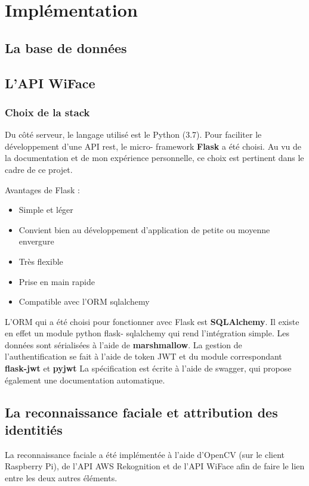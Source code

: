 \chapter{Implémentation}
\label{ch:implémentation}

\section{La base de données}

\section{L'API WiFace}

\subsection{Choix de la stack}

Du côté serveur, le langage utilisé est le Python (3.7). Pour faciliter le développement d’une API rest, le micro-
framework \textbf{Flask} a été choisi. Au vu de la documentation et de mon expérience personnelle, ce choix est pertinent
dans le cadre de ce projet.

Avantages de Flask :
\begin{itemize}
\item Simple et léger
\item Convient bien au développement d’application de petite ou moyenne envergure
\item Très flexible
\item Prise en main rapide
\item Compatible avec l’ORM sqlalchemy
\end{itemize}

L’ORM qui a été choisi pour fonctionner avec Flask est \textbf{SQLAlchemy}. Il existe en effet un module python flask-
sqlalchemy qui rend l’intégration simple.
Les données sont sérialisées à l’aide de \textbf{marshmallow}.
La gestion de l’authentification se fait à l’aide de token JWT et du module correspondant \textbf{flask-jwt} et \textbf{pyjwt}
La spécification est écrite à l’aide de swagger, qui propose également une documentation automatique.

\section{La reconnaissance faciale et attribution des identitiés}

La reconnaissance faciale a été implémentée à l'aide d'OpenCV (sur le client Raspberry Pi), de l'API AWS Rekognition et de l'API WiFace
afin de faire le lien entre les deux autres éléments. 

